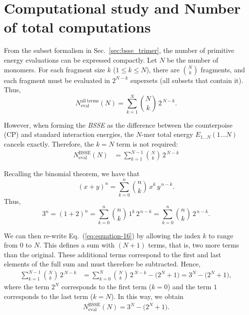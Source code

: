 \section{Computational study and Number of total computations}
\label{sec:plan}

From the subset formalism in Sec.~\ref{sec:bsse_trimer}, the number of
primitive energy evaluations can be expressed compactly. Let $N$ be the
number of monomers. For each fragment size $k$ ($1\le k\le N$), there are
$\binom{N}{k}$ fragments, and each fragment must be evaluated in
$2^{N-k}$ supersets (all subsets that contain it). Thus,
\begin{equation}
N_{\mathrm{eval}}^{\mathrm{all\ terms}}(N)
= \sum_{k=1}^{N} \binom{N}{k}\,2^{\,N-k}.
\label{eq:Neval_all}
\end{equation}

However, when forming the \emph{BSSE} as the difference between the
counterpoise (CP) and standard interaction energies, the $N$-mer total
energy $E_{1\ldots N}(1\ldots N)$ cancels exactly. Therefore, the
$k=N$ term is not required:
\begin{align}
N_{\mathrm{eval}}^{\mathrm{BSSE}}(N)
&= \sum_{k=1}^{N-1} \binom{N}{k}\,2^{\,N-k}
\label{eq:equation-16}
\end{align}

\clearpage
Recalling the binomial theorem\autocite{Beeler2015}, we have that
\begin{equation*}
(x+y)^{n}
  = \sum_{k=0}^{n} \binom{n}{k}\,x^{k}\,y^{\,n-k}.
\end{equation*}
Thus,
\begin{equation*}
    3^{n}
    = (1+2)^{n}
    = \sum_{k=0}^{n} \binom{n}{k}\,1^{k}\,2^{\,n-k}
    = \sum_{k=0}^{n}\binom{n}{k}\,2^{\,n-k}.
\end{equation*}

\noindent
We can then re-write Eq.~(\ref{eq:equation-16}) by allowing the index
$k$ to range from $0$ to $N$. This defines a sum with $(N+1)$ terms,
that is, two more terms than the original.
These additional terms correspond to the first and last elements of
the full sum and must therefore be subtracted. Hence,
\begin{align*}
\sum_{k=1}^{N-1} \binom{N}{k}\,2^{\,N-k}
&=
\sum_{k=0}^{N} \binom{N}{k}\,2^{\,N-k}
 - \bigl(2^{N} + 1\bigr)
 = 3^{N} - \bigl(2^{N} + 1\bigr),
\end{align*}
where the term $2^{N}$ corresponds to the first term ($k=0$)
and the term $1$ corresponds to the last term ($k=N$).
In this way, we obtain
\begin{align}
N_{\mathrm{eval}}^{\mathrm{BSSE}}(N)
   = 3^{N} - \bigl(2^{N} + 1\bigr).
\label{eq:equation-18}
\end{align}

